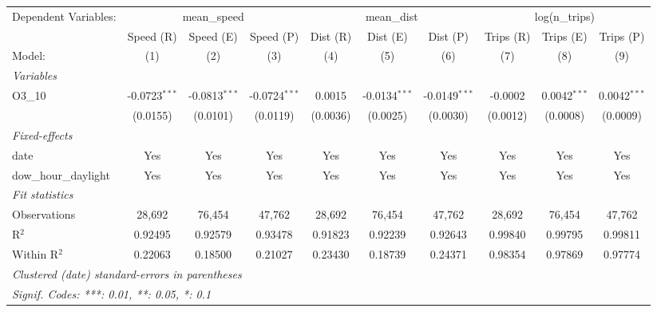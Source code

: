 \begingroup
\centering
\begin{tabular}{lccccccccc}
   \tabularnewline \midrule \midrule
   Dependent Variables: & \multicolumn{3}{c}{mean\_speed} & \multicolumn{3}{c}{mean\_dist} & \multicolumn{3}{c}{log(n\_trips)}\\
                         & Speed (R)       & Speed (E)       & Speed (P)       & Dist (R) & Dist (E)        & Dist (P)        & Trips (R) & Trips (E)      & Trips (P) \\   
   Model:                & (1)             & (2)             & (3)             & (4)      & (5)             & (6)             & (7)       & (8)            & (9)\\  
   \midrule
   \emph{Variables}\\
   O3\_10                & -0.0723$^{***}$ & -0.0813$^{***}$ & -0.0724$^{***}$ & 0.0015   & -0.0134$^{***}$ & -0.0149$^{***}$ & -0.0002   & 0.0042$^{***}$ & 0.0042$^{***}$\\   
                         & (0.0155)        & (0.0101)        & (0.0119)        & (0.0036) & (0.0025)        & (0.0030)        & (0.0012)  & (0.0008)       & (0.0009)\\   
   \midrule
   \emph{Fixed-effects}\\
   date                  & Yes             & Yes             & Yes             & Yes      & Yes             & Yes             & Yes       & Yes            & Yes\\  
   dow\_hour\_daylight   & Yes             & Yes             & Yes             & Yes      & Yes             & Yes             & Yes       & Yes            & Yes\\  
   \midrule
   \emph{Fit statistics}\\
   Observations          & 28,692          & 76,454          & 47,762          & 28,692   & 76,454          & 47,762          & 28,692    & 76,454         & 47,762\\  
   R$^2$                 & 0.92495         & 0.92579         & 0.93478         & 0.91823  & 0.92239         & 0.92643         & 0.99840   & 0.99795        & 0.99811\\  
   Within R$^2$          & 0.22063         & 0.18500         & 0.21027         & 0.23430  & 0.18739         & 0.24371         & 0.98354   & 0.97869        & 0.97774\\  
   \midrule \midrule
   \multicolumn{10}{l}{\emph{Clustered (date) standard-errors in parentheses}}\\
   \multicolumn{10}{l}{\emph{Signif. Codes: ***: 0.01, **: 0.05, *: 0.1}}\\
\end{tabular}
\par\endgroup

